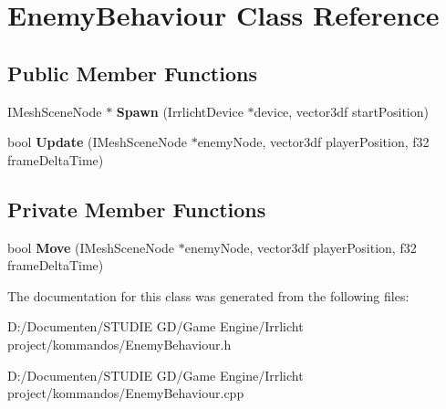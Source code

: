 \hypertarget{class_enemy_behaviour}{}\section{Enemy\+Behaviour Class Reference}
\label{class_enemy_behaviour}
\subsection*{Public Member Functions}
\begin{DoxyCompactItemize}
\item 
\mbox{\label{class_enemy_behaviour_ab939353a2a71b7845ab189c513428261}} 
I\+Mesh\+Scene\+Node $\ast$ {\bfseries Spawn} (Irrlicht\+Device $\ast$device, vector3df start\+Position)
\item 
\mbox{\label{class_enemy_behaviour_a1d0bb3932590897b6cd466c5ad3c75b0}} 
bool {\bfseries Update} (I\+Mesh\+Scene\+Node $\ast$enemy\+Node, vector3df player\+Position, f32 frame\+Delta\+Time)
\end{DoxyCompactItemize}
\subsection*{Private Member Functions}
\begin{DoxyCompactItemize}
\item 
\mbox{\label{class_enemy_behaviour_ae9579b2147baa156496e618e7d1ae6cb}} 
bool {\bfseries Move} (I\+Mesh\+Scene\+Node $\ast$enemy\+Node, vector3df player\+Position, f32 frame\+Delta\+Time)
\end{DoxyCompactItemize}


The documentation for this class was generated from the following files\+:\begin{DoxyCompactItemize}
\item 
D\+:/\+Documenten/\+S\+T\+U\+D\+I\+E G\+D/\+Game Engine/\+Irrlicht project/kommandos/Enemy\+Behaviour.\+h\item 
D\+:/\+Documenten/\+S\+T\+U\+D\+I\+E G\+D/\+Game Engine/\+Irrlicht project/kommandos/Enemy\+Behaviour.\+cpp\end{DoxyCompactItemize}
